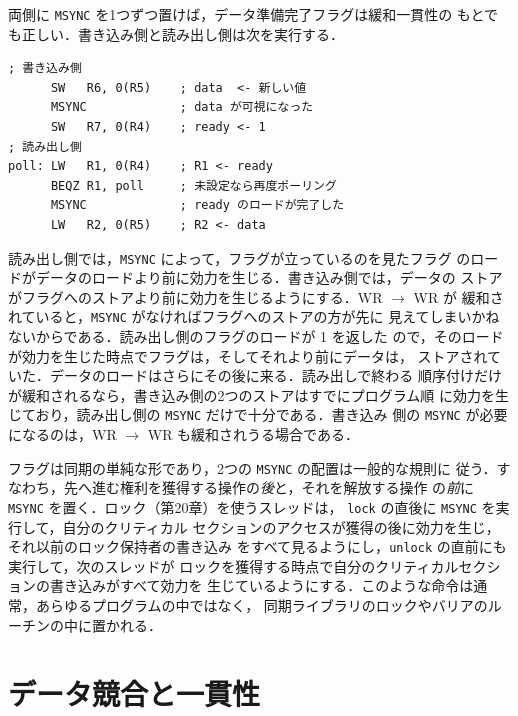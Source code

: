 \documentclass[../main.tex]{subfiles}
\begin{document}
両側に \texttt{MSYNC} を1つずつ置けば，データ準備完了フラグは緩和一貫性の
もとでも正しい．書き込み側と読み出し側は次を実行する．
\begin{lstlisting}[language={[x86masm]Assembler}, numbers=none]
; 書き込み側
      SW   R6, 0(R5)    ; data  <- 新しい値
      MSYNC             ; data が可視になった
      SW   R7, 0(R4)    ; ready <- 1
; 読み出し側
poll: LW   R1, 0(R4)    ; R1 <- ready
      BEQZ R1, poll     ; 未設定なら再度ポーリング
      MSYNC             ; ready のロードが完了した
      LW   R2, 0(R5)    ; R2 <- data
\end{lstlisting}
読み出し側では，\texttt{MSYNC} によって，フラグが立っているのを見たフラグ
のロードがデータのロードより前に効力を生じる．書き込み側では，データの
ストアがフラグへのストアより前に効力を生じるようにする．WR $\to$ WR が
緩和されていると，\texttt{MSYNC} がなければフラグへのストアの方が先に
見えてしまいかねないからである．読み出し側のフラグのロードが 1 を返した
ので，そのロードが効力を生じた時点でフラグは，そしてそれより前にデータは，
ストアされていた．データのロードはさらにその後に来る．読み出しで終わる
順序付けだけが緩和されるなら，書き込み側の2つのストアはすでにプログラム順
に効力を生じており，読み出し側の \texttt{MSYNC} だけで十分である．書き込み
側の \texttt{MSYNC} が必要になるのは，WR $\to$ WR も緩和されうる場合である．

フラグは同期の単純な形であり，2つの \texttt{MSYNC} の配置は一般的な規則に
従う．すなわち，先へ進む権利を獲得する操作の\emph{後}と，それを解放する操作
の\emph{前}に \texttt{MSYNC} を置く．ロック（第20章）を使うスレッドは，
\texttt{lock} の直後に \texttt{MSYNC} を実行して，自分のクリティカル
セクションのアクセスが獲得の後に効力を生じ，それ以前のロック保持者の書き込み
をすべて見るようにし，\texttt{unlock} の直前にも実行して，次のスレッドが
ロックを獲得する時点で自分のクリティカルセクションの書き込みがすべて効力を
生じているようにする．このような命令は通常，あらゆるプログラムの中ではなく，
同期ライブラリのロックやバリアのルーチンの中に置かれる．

\section{データ競合と一貫性}
\label{sec:l21-races}
\end{document}
